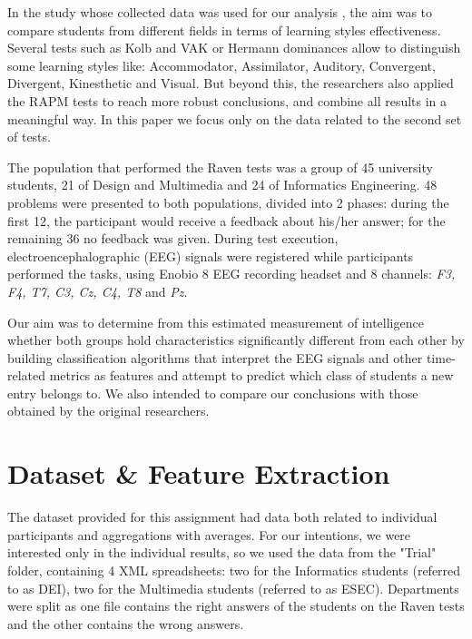 \documentclass[extendedabs]{recpad2k}
\begin{document}
In the study whose collected data was used for our analysis \cite{study}, the aim was to compare students from different fields in terms of learning styles effectiveness.
Several tests such as Kolb and VAK or Hermann dominances allow to distinguish some learning styles like: Accommodator, Assimilator, Auditory, Convergent,
Divergent, Kinesthetic and Visual.
But beyond this, the researchers also applied the RAPM tests to reach more robust conclusions, and combine all results in a meaningful way.
In this paper we focus only on the data related to the second set of tests.

The population that performed the Raven tests was a group of 45 university students, 21 of Design and Multimedia and 24 of Informatics Engineering.
48 problems were presented to both populations, divided into 2 phases: during the first 12, the participant would receive a feedback about his/her answer; 
for the remaining 36 no feedback was given.
During test execution, electroencephalographic (EEG) signals were registered while participants performed the tasks, using Enobio 8 EEG recording headset and 8 
channels: \textit{F3, F4, T7, C3, Cz, C4, T8} and \textit{Pz}.

Our aim was to determine from this estimated measurement of intelligence whether both groups hold characteristics significantly different from each other by 
building classification algorithms that interpret the EEG signals and other time-related metrics as features and attempt to predict which class of students a 
new entry belongs to.
We also intended to compare our conclusions with those obtained by the original researchers.

\section{Dataset \& Feature Extraction} %

The dataset provided for this assignment had data both related to individual participants and aggregations with averages.
For our intentions, we were interested only in the individual results, so we used the data from the "Trial" folder, containing 4 XML spreadsheets: two for the 
Informatics students (referred to as DEI), two for the Multimedia students (referred to as ESEC).
Departments were split as one file contains the right answers of the students on the Raven tests and the other contains the wrong answers.
\end{document}
